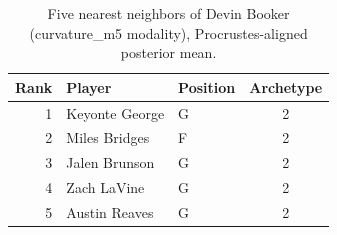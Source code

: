\begin{table}[htbp]
  \centering\small
  \begin{tabular}{rllc}
    \toprule
    Rank & Player & Position & Archetype \\
    \midrule
    1 & Keyonte George & G & 2 \\
    2 & Miles Bridges & F & 2 \\
    3 & Jalen Brunson & G & 2 \\
    4 & Zach LaVine & G & 2 \\
    5 & Austin Reaves & G & 2 \\
    \bottomrule
  \end{tabular}
  \caption{Five nearest neighbors of Devin Booker (curvature_m5 modality), Procrustes-aligned posterior mean.}
  \label{tab:Devin_Booker_neighbors_curvature_m5}
\end{table}

